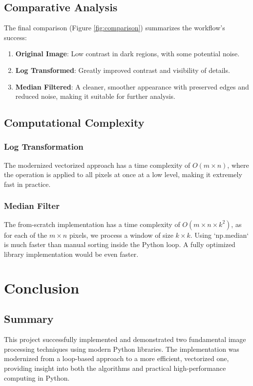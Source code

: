 \documentclass[12pt,a4paper]{article}
\begin{document}
\subsection{Comparative Analysis}
The final comparison (Figure \ref{fig:comparison}) summarizes the workflow's success:
\begin{enumerate}
    \item \textbf{Original Image}: Low contrast in dark regions, with some potential noise.
    \item \textbf{Log Transformed}: Greatly improved contrast and visibility of details.
    \item \textbf{Median Filtered}: A cleaner, smoother appearance with preserved edges and reduced noise, making it suitable for further analysis.
\end{enumerate}

\subsection{Computational Complexity}
\subsubsection{Log Transformation}
The modernized vectorized approach has a time complexity of $O(m \times n)$, where the operation is applied to all pixels at once at a low level, making it extremely fast in practice.

\subsubsection{Median Filter}
The from-scratch implementation has a time complexity of $O(m \times n \times k^2)$, as for each of the $m \times n$ pixels, we process a window of size $k \times k$. Using `np.median` is much faster than manual sorting inside the Python loop. A fully optimized library implementation would be even faster.

\section{Conclusion}

\subsection{Summary}
This project successfully implemented and demonstrated two fundamental image processing techniques using modern Python libraries. The implementation was modernized from a loop-based approach to a more efficient, vectorized one, providing insight into both the algorithms and practical high-performance computing in Python.
\end{document}
